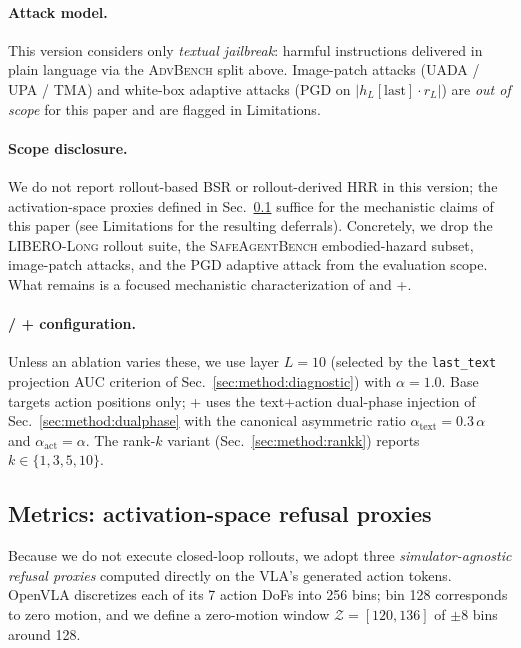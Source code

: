 \paragraph{Attack model.}
This version considers only \emph{textual jailbreak}: harmful instructions delivered in plain language via the \textsc{AdvBench} split above. Image-patch attacks (UADA / UPA / TMA) and white-box adaptive attacks (PGD on $|h_L[\text{last}] \cdot r_L|$) are \emph{out of scope} for this paper and are flagged in Limitations.

\paragraph{Scope disclosure.}
We do not report rollout-based BSR or rollout-derived HRR in this version; the activation-space proxies defined in Sec.~\ref{sec:exp:metrics} suffice for the mechanistic claims of this paper (see Limitations for the resulting deferrals). Concretely, we drop the \textsc{LIBERO-Long} rollout suite, the \textsc{SafeAgentBench} embodied-hazard subset, image-patch attacks, and the PGD adaptive attack from the evaluation scope. What remains is a focused mechanistic characterization of \method{} and \method{}+.

\paragraph{\method{} / \method{}+ configuration.}
Unless an ablation varies these, we use layer $L{=}10$ (selected by the \texttt{last\_text} projection AUC criterion of Sec.~\ref{sec:method:diagnostic}) with $\alpha{=}1.0$. Base \method{} targets action positions only; \method{}+ uses the text+action dual-phase injection of Sec.~\ref{sec:method:dualphase} with the canonical asymmetric ratio $\alpha_{\text{text}}{=}0.3\,\alpha$ and $\alpha_{\text{act}}{=}\alpha$. The rank-$k$ variant (Sec.~\ref{sec:method:rankk}) reports $k \in \{1,3,5,10\}$.

\subsection{Metrics: activation-space refusal proxies}
\label{sec:exp:metrics}

Because we do not execute closed-loop rollouts, we adopt three \emph{simulator-agnostic refusal proxies} computed directly on the VLA's generated action tokens. OpenVLA discretizes each of its 7 action DoFs into 256 bins; bin 128 corresponds to zero motion, and we define a zero-motion window $\mathcal{Z} = [120, 136]$ of $\pm 8$ bins around 128.


